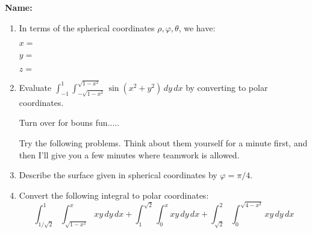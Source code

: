 \documentclass[12pt]{article}
\newcommand{\di}{\displaystyle}
\begin{document}
{\bf \Large Name:}
\thispagestyle{fancy}

 \begin{enumerate}
 \item In terms of the spherical coordinates $\rho, \varphi, \theta$, we have:

\bigskip

$x=$

\vspace{0.5in}

$y=$

\vspace{0.5in}

$z=$

\vspace{0.5in}


 \item Evaluate $\di \int_{-1}^1\int_{-\sqrt{1-x^2}}^{\sqrt{1-x^2}}\sin(x^2+y^2)\,dy\,dx$ by converting to polar coordinates.

\vspace{5in}

Turn over for bouns fun.....
\newpage

Try the following problems. Think about them yourself for a minute first, and then I'll give you a few minutes where teamwork is allowed.

\item Describe the surface given in spherical coordinates by $\varphi = \pi/4$.

\vspace{3in}

\item Convert the following integral to polar coordinates:
\[
 \int_{1/\sqrt{2}}^1\int_{\sqrt{1-x^2}}^x xy\,dy\,dx + \int_1^{\sqrt{2}}\int_0^x xy\,dy\,dx + \int_{\sqrt{2}}^2\int_0^{\sqrt{4-x^2}}xy\,dy\,dx
\]

 
\end{enumerate}
\end{document}
